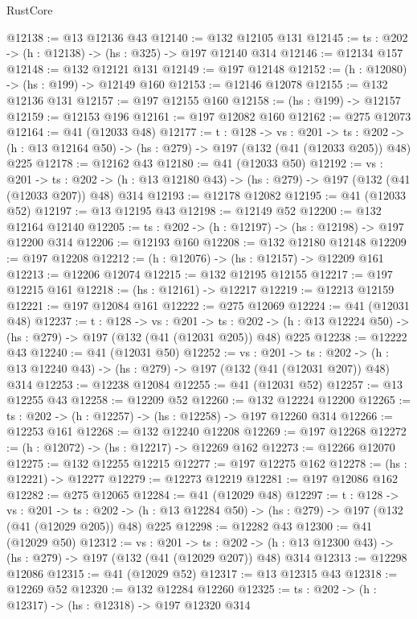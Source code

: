 \begin{lexlean}{RustCore}
\begin{coremodule}
@12138 := @13 @12136 @43
@12140 := @132 @12105 @131
@12145 := {ts : @202} -> (h : @12138) -> (hs : @325) -> @197 @12140 @314
@12146 := @12134 @157
@12148 := @132 @12121 @131
@12149 := @197 @12148
@12152 := (h : @12080) -> (hs : @199) -> @12149 @160
@12153 := @12146 @12078
@12155 := @132 @12136 @131
@12157 := @197 @12155 @160
@12158 := (hs : @199) -> @12157
@12159 := @12153 @196
@12161 := @197 @12082 @160
@12162 := @275 @12073
@12164 := @41 (@12033 @48)
@12177 := {t : @128} ->
  {vs : @201} ->
  {ts : @202} -> (h : @13 @12164 @50) -> (hs : @279) -> @197 (@132 (@41 (@12033 @205)) @48) @225
@12178 := @12162 @43
@12180 := @41 (@12033 @50)
@12192 := {vs : @201} ->
  {ts : @202} -> (h : @13 @12180 @43) -> (hs : @279) -> @197 (@132 (@41 (@12033 @207)) @48) @314
@12193 := @12178 @12082
@12195 := @41 (@12033 @52)
@12197 := @13 @12195 @43
@12198 := @12149 @52
@12200 := @132 @12164 @12140
@12205 := {ts : @202} -> (h : @12197) -> (hs : @12198) -> @197 @12200 @314
@12206 := @12193 @160
@12208 := @132 @12180 @12148
@12209 := @197 @12208
@12212 := (h : @12076) -> (hs : @12157) -> @12209 @161
@12213 := @12206 @12074
@12215 := @132 @12195 @12155
@12217 := @197 @12215 @161
@12218 := (hs : @12161) -> @12217
@12219 := @12213 @12159
@12221 := @197 @12084 @161
@12222 := @275 @12069
@12224 := @41 (@12031 @48)
@12237 := {t : @128} ->
  {vs : @201} ->
  {ts : @202} -> (h : @13 @12224 @50) -> (hs : @279) -> @197 (@132 (@41 (@12031 @205)) @48) @225
@12238 := @12222 @43
@12240 := @41 (@12031 @50)
@12252 := {vs : @201} ->
  {ts : @202} -> (h : @13 @12240 @43) -> (hs : @279) -> @197 (@132 (@41 (@12031 @207)) @48) @314
@12253 := @12238 @12084
@12255 := @41 (@12031 @52)
@12257 := @13 @12255 @43
@12258 := @12209 @52
@12260 := @132 @12224 @12200
@12265 := {ts : @202} -> (h : @12257) -> (hs : @12258) -> @197 @12260 @314
@12266 := @12253 @161
@12268 := @132 @12240 @12208
@12269 := @197 @12268
@12272 := (h : @12072) -> (hs : @12217) -> @12269 @162
@12273 := @12266 @12070
@12275 := @132 @12255 @12215
@12277 := @197 @12275 @162
@12278 := (hs : @12221) -> @12277
@12279 := @12273 @12219
@12281 := @197 @12086 @162
@12282 := @275 @12065
@12284 := @41 (@12029 @48)
@12297 := {t : @128} ->
  {vs : @201} ->
  {ts : @202} -> (h : @13 @12284 @50) -> (hs : @279) -> @197 (@132 (@41 (@12029 @205)) @48) @225
@12298 := @12282 @43
@12300 := @41 (@12029 @50)
@12312 := {vs : @201} ->
  {ts : @202} -> (h : @13 @12300 @43) -> (hs : @279) -> @197 (@132 (@41 (@12029 @207)) @48) @314
@12313 := @12298 @12086
@12315 := @41 (@12029 @52)
@12317 := @13 @12315 @43
@12318 := @12269 @52
@12320 := @132 @12284 @12260
@12325 := {ts : @202} -> (h : @12317) -> (hs : @12318) -> @197 @12320 @314

\end{coremodule}
\end{lexlean}
